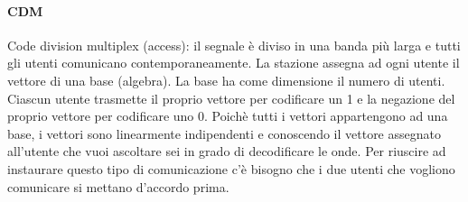\documentclass{article}
\begin{document}
\paragraph{CDM} Code division multiplex (access): il segnale è diviso in una banda 
più larga e tutti gli utenti comunicano contemporaneamente. La stazione assegna 
ad ogni utente il vettore di una base (algebra). La base ha come dimensione il 
numero di utenti. Ciascun utente trasmette il proprio vettore per codificare un 
1 e la negazione del proprio vettore per codificare uno 0. Poichè tutti i vettori 
appartengono ad una base, i vettori sono linearmente indipendenti e conoscendo il vettore 
assegnato all'utente che vuoi ascoltare sei in grado di decodificare le onde. Per riuscire 
ad instaurare questo tipo di comunicazione c'è bisogno che i due utenti che
vogliono comunicare si mettano d'accordo prima.
\end{document}
